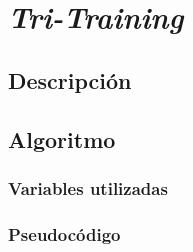 \section{\textit{Tri-Training}}

\subsection{Descripción}

\subsection{Algoritmo}

\subsubsection{Variables utilizadas}

\subsubsection{Pseudocódigo}

